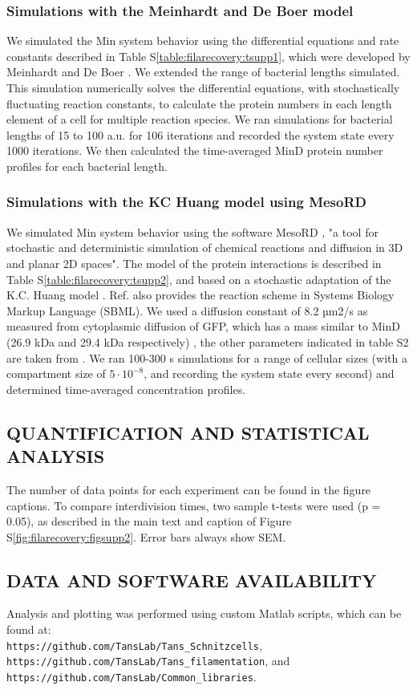 \subsubsection{Simulations with the Meinhardt and De Boer model}
We simulated the Min system behavior using the differential equations and rate constants described in Table S\ref{table:filarecovery:tsupp1}, which were developed by Meinhardt and De Boer \cite{Meinhardt2001}. We extended the range of bacterial lengths simulated. This simulation numerically solves the differential equations, with stochastically fluctuating reaction constants, to calculate the protein numbers in each length element of a cell for multiple reaction species. We ran simulations for bacterial lengths of 15 to 100 a.u. for 106 iterations and recorded the system state every 1000 iterations. We then calculated the time-averaged MinD protein number profiles for each bacterial length. 

\subsubsection{Simulations with the KC Huang model using MesoRD}
We simulated Min system behavior using the software MesoRD \cite{Hattne2005}, "a tool for stochastic and deterministic simulation of chemical reactions and diffusion in 3D and planar 2D spaces". 
The model of the protein interactions is described in Table S\ref{table:filarecovery:tsupp2}, and based on a stochastic adaptation \cite{Fange2006} of the K.C. Huang model \cite{Huang2003}. Ref.  \cite{Fange2006} also provides the reaction scheme in Systems Biology Markup Language (SBML). 
We used a diffusion constant of 8.2 µm2/s as measured from cytoplasmic diffusion of GFP, which has a mass similar to MinD (26.9 kDa and 29.4 kDa respectively) \cite{Elowitz1999}, the other parameters indicated in table S2 are taken from \cite{Fange2006}. 
We ran 100-300 s simulations for a range of cellular sizes (with a compartment size of $5\cdot10^{-8}$, and recording the system state every second) and determined time-averaged concentration profiles.

\subsection{QUANTIFICATION AND STATISTICAL ANALYSIS}
The number of data points for each experiment can be found in the figure captions. To compare interdivision times, two sample t-tests were used (p = 0.05), as described in the main text and caption of Figure S\ref{fig:filarecovery:figsupp2}. Error bars always show SEM.

\subsection{DATA AND SOFTWARE AVAILABILITY}
Analysis and plotting was performed using custom Matlab scripts, which can be found at: \\
\texttt{https://github.com/TansLab/Tans\_Schnitzcells}, \\ 
\texttt{https://github.com/TansLab/Tans\_filamentation}, and \\
\texttt{https://github.com/TansLab/Common\_libraries}.

